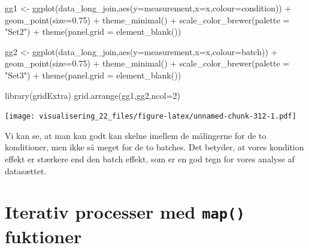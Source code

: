 \documentclass[
]{book}
\newenvironment{Shaded}{\begin{snugshade}}{\end{snugshade}}
\newcommand{\AttributeTok}[1]{\textcolor[rgb]{0.77,0.63,0.00}{#1}}
\newcommand{\DecValTok}[1]{\textcolor[rgb]{0.00,0.00,0.81}{#1}}
\newcommand{\FloatTok}[1]{\textcolor[rgb]{0.00,0.00,0.81}{#1}}
\newcommand{\FunctionTok}[1]{\textcolor[rgb]{0.00,0.00,0.00}{#1}}
\newcommand{\NormalTok}[1]{#1}
\newcommand{\OtherTok}[1]{\textcolor[rgb]{0.56,0.35,0.01}{#1}}
\newcommand{\SpecialCharTok}[1]{\textcolor[rgb]{0.00,0.00,0.00}{#1}}
\newcommand{\StringTok}[1]{\textcolor[rgb]{0.31,0.60,0.02}{#1}}
\begin{document}
\begin{Shaded}
\begin{Highlighting}[]
\NormalTok{gg1 }\OtherTok{\textless{}{-}} \FunctionTok{ggplot}\NormalTok{(data\_long\_join,}\FunctionTok{aes}\NormalTok{(}\AttributeTok{y=}\NormalTok{measurement,}\AttributeTok{x=}\NormalTok{x,}\AttributeTok{colour=}\NormalTok{condition)) }\SpecialCharTok{+} 
  \FunctionTok{geom\_point}\NormalTok{(}\AttributeTok{size=}\FloatTok{0.75}\NormalTok{) }\SpecialCharTok{+}
  \FunctionTok{theme\_minimal}\NormalTok{() }\SpecialCharTok{+}
  \FunctionTok{scale\_color\_brewer}\NormalTok{(}\AttributeTok{palette =} \StringTok{"Set2"}\NormalTok{) }\SpecialCharTok{+}
  \FunctionTok{theme}\NormalTok{(}\AttributeTok{panel.grid =} \FunctionTok{element\_blank}\NormalTok{())}

\NormalTok{gg2 }\OtherTok{\textless{}{-}} \FunctionTok{ggplot}\NormalTok{(data\_long\_join,}\FunctionTok{aes}\NormalTok{(}\AttributeTok{y=}\NormalTok{measurement,}\AttributeTok{x=}\NormalTok{x,}\AttributeTok{colour=}\NormalTok{batch)) }\SpecialCharTok{+} 
  \FunctionTok{geom\_point}\NormalTok{(}\AttributeTok{size=}\FloatTok{0.75}\NormalTok{) }\SpecialCharTok{+}
  \FunctionTok{theme\_minimal}\NormalTok{() }\SpecialCharTok{+}
  \FunctionTok{scale\_color\_brewer}\NormalTok{(}\AttributeTok{palette =} \StringTok{"Set3"}\NormalTok{) }\SpecialCharTok{+}
  \FunctionTok{theme}\NormalTok{(}\AttributeTok{panel.grid =} \FunctionTok{element\_blank}\NormalTok{())}

\FunctionTok{library}\NormalTok{(gridExtra)}
\FunctionTok{grid.arrange}\NormalTok{(gg1,gg2,}\AttributeTok{ncol=}\DecValTok{2}\NormalTok{)}
\end{Highlighting}
\end{Shaded}

\texttt{[image: visualisering\_22\_files/figure-latex/unnamed-chunk-312-1.pdf]}

Vi kan se, at man kan godt kan skelne imellem de målingerne for de to konditioner, men ikke så meget for de to batches. Det betyder, at vores kondition effekt er stærkere end den batch effekt, som er en god tegn for vores analyse af datasættet.

\hypertarget{iterativ-processer-med-map-fuktioner}{%
\section{\texorpdfstring{Iterativ processer med \texttt{map()} fuktioner}{Iterativ processer med map() fuktioner}}\label{iterativ-processer-med-map-fuktioner}}
\end{document}
